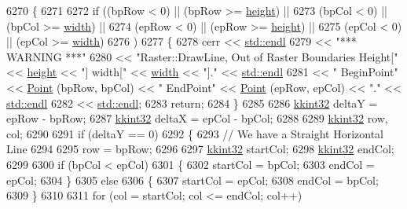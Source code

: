 \begin{DoxyCode}
6270 \{
6271 
6272   \textcolor{keywordflow}{if}  ((bpRow < 0)  ||  (bpRow >= \hyperlink{class_k_k_b_1_1_raster_af39ff189de4fbb6de98392e187efafb7}{height})  ||
6273        (bpCol < 0)  ||  (bpCol >= \hyperlink{class_k_k_b_1_1_raster_ae0bcc103e191c3421d7692dc69ceb554}{width})   ||
6274        (epRow < 0)  ||  (epRow >= \hyperlink{class_k_k_b_1_1_raster_af39ff189de4fbb6de98392e187efafb7}{height})  ||
6275        (epCol < 0)  ||  (epCol >= \hyperlink{class_k_k_b_1_1_raster_ae0bcc103e191c3421d7692dc69ceb554}{width})
6276       )
6277   \{
6278     cerr << \hyperlink{namespace_k_k_b_ad1f50f65af6adc8fa9e6f62d007818a8}{std::endl}
6279          << \textcolor{stringliteral}{"*** WARNING ***"}
6280          << \textcolor{stringliteral}{"Raster::DrawLine,  Out of Raster Boundaries   Height["} << \hyperlink{class_k_k_b_1_1_raster_af39ff189de4fbb6de98392e187efafb7}{height} << \textcolor{stringliteral}{"]  width["} << 
      \hyperlink{class_k_k_b_1_1_raster_ae0bcc103e191c3421d7692dc69ceb554}{width} << \textcolor{stringliteral}{"]."}  << \hyperlink{namespace_k_k_b_ad1f50f65af6adc8fa9e6f62d007818a8}{std::endl}
6281          << \textcolor{stringliteral}{"                   BeginPoint"} << \hyperlink{class_k_k_b_1_1_point}{Point} (bpRow, bpCol) << \textcolor{stringliteral}{"   EndPoint"} << 
      \hyperlink{class_k_k_b_1_1_point}{Point} (epRow, epCol) << \textcolor{stringliteral}{"."} << \hyperlink{namespace_k_k_b_ad1f50f65af6adc8fa9e6f62d007818a8}{std::endl}
6282          << \hyperlink{namespace_k_k_b_ad1f50f65af6adc8fa9e6f62d007818a8}{std::endl};
6283     \textcolor{keywordflow}{return};
6284   \}
6285 
6286   \hyperlink{namespace_k_k_b_a8fa4952cc84fda1de4bec1fbdd8d5b1b}{kkint32}  deltaY = epRow - bpRow;
6287   \hyperlink{namespace_k_k_b_a8fa4952cc84fda1de4bec1fbdd8d5b1b}{kkint32}  deltaX = epCol - bpCol;
6288 
6289   \hyperlink{namespace_k_k_b_a8fa4952cc84fda1de4bec1fbdd8d5b1b}{kkint32}  row, col;
6290 
6291   \textcolor{keywordflow}{if}  (deltaY == 0)
6292   \{
6293     \textcolor{comment}{// We have a Straight Horizontal Line}
6294 
6295     row = bpRow;
6296     
6297     \hyperlink{namespace_k_k_b_a8fa4952cc84fda1de4bec1fbdd8d5b1b}{kkint32}  startCol;
6298     \hyperlink{namespace_k_k_b_a8fa4952cc84fda1de4bec1fbdd8d5b1b}{kkint32}  endCol;
6299 
6300     \textcolor{keywordflow}{if}  (bpCol < epCol)
6301     \{
6302       startCol = bpCol;
6303       endCol   = epCol;
6304     \}
6305     \textcolor{keywordflow}{else}
6306     \{
6307       startCol = epCol;
6308       endCol   = bpCol;
6309     \}
6310 
6311     \textcolor{keywordflow}{for}  (col = startCol;  col <= endCol;  col++)

\end{DoxyCode}
